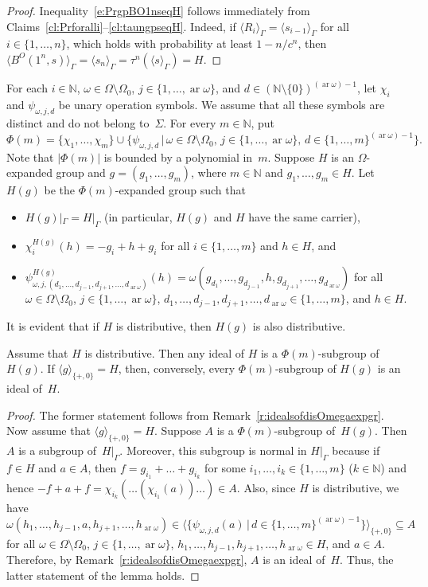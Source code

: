 \documentclass{jgcc}
\DeclareMathOperator{\ar}{ar}
\newcommand{\cs}{,\,}
\newcommand{\st}{\,|\,}
\newcommand{\Add}[1]{#1|_\Gamma}
\newcommand{\alg}[1]{\langle#1\rangle}
\newcommand{\gp}[1]{\langle#1\rangle_\Gamma}
\newcommand{\acl}[1]{\lvert#1\rvert}
\newcommand{\N}{\mathbb N}
\begin{document}
\begin{proof}
Inequality~\eqref{e:PrgpBO1nseqH} follows immediately from
Claims~\ref{cl:Prforalli}--\ref{cl:taungpseqH}. Indeed, if
$\gp{R_i}=\gp{s_{i-1}}$ for all $i\in\{1,\dots,n\}$, which
holds with probability at least $1-n/c^n$, then
$\gp{B^O(1^n,s)}=\gp{s_n}=\tau^n(\gp s)=H$.
\end{proof}

For each $i\in\N$, $\omega\in\Omega\setminus\Omega_0$,
$j\in\{1,\dots,\ar\omega\}$, and
$d\in(\N\setminus\{0\})^{(\ar\omega)-1}$, let $\chi_i$ and
$\psi_{\omega,j,d}$ be unary operation symbols. We assume
that all these symbols are distinct and do not belong
to~$\Sigma$. For every $m\in\N$, put
\[
\Phi(m)=\{\chi_1,\dots,\chi_m\}\cup\{\psi_{\omega,j,d}\st
\omega\in\Omega\setminus\Omega_0\cs
j\in\{1,\dots,\ar\omega\}\cs
d\in\{1,\dots,m\}^{(\ar\omega)-1}\}.
\]
Note that $\acl{\Phi(m)}$ is bounded by a polynomial in~$m$.
Suppose $H$ is an $\Omega$-expanded group and
$g=(g_1,\dots,g_m)$, where $m\in\N$ and $g_1,\dots,g_m\in
H$. Let $H(g)$ be the $\Phi(m)$-expanded group such that
\begin{itemize}
\item $\Add{H(g)}=\Add H$ (in particular, $H(g)$ and $H$
have the same carrier),

\item $\chi_i^{H(g)}(h)=-g_i+h+g_i$ for all
$i\in\{1,\dots,m\}$ and $h\in H$, and

\item $\psi_{\omega,j,(d_1,\dots,d_{j-1},d_{j+1},\dots,
d_{\ar\omega})}^{H(g)}(h)=\omega(g_{d_1},\dots,g_{d_{j-1}},
h,g_{d_{j+1}},\dots,g_{d_{\ar\omega}})$ for all
$\omega\in\Omega\setminus\Omega_0$,
$j\in\{1,\dots,\ar\omega\}$,
$d_1,\dots,d_{j-1},d_{j+1},\dots,d_{\ar\omega}\in\{1,\dots,m\}$,
and $h\in H$.
\end{itemize}
It is evident that if $H$ is distributive, then $H(g)$ is
also distributive.

\begin{lem}
\label{l:idofHandPhimsubgrofHg}
Assume that $H$ is distributive. Then any ideal of $H$ is a
$\Phi(m)$-subgroup of $H(g)$. If $\alg g_{\{+,0\}}=H$, then,
conversely, every $\Phi(m)$-subgroup of $H(g)$ is an ideal
of~$H$.
\end{lem}
\begin{proof}
The former statement follows from
Remark~\ref{r:idealsofdisOmegaexpgr}. Now assume that $\alg
g_{\{+,0\}}=H$. Suppose $A$ is a $\Phi(m)$-subgroup
of~$H(g)$. Then $A$ is a subgroup of~$\Add H$. Moreover,
this subgroup is normal in $\Add H$ because if $f\in H$ and
$a\in A$, then $f=g_{i_1}+\dots+g_{i_k}$ for some
$i_1,\dots,i_k\in\{1,\dots,m\}$ ($k\in\N$) and hence
$-f+a+f=\chi_{i_k}(\dots(\chi_{i_1}(a))\dots)\in A$. Also,
since $H$ is distributive, we have
\[
\omega(h_1,\dots,h_{j-1},a,h_{j+1},\dots,h_{\ar\omega})
\in\alg{\{\psi_{\omega,j,d}(a)\st
d\in\{1,\dots,m\}^{(\ar\omega)-1}\}}_{\{+,0\}}\subseteq A
\]
for all $\omega\in\Omega\setminus\Omega_0$,
$j\in\{1,\dots,\ar\omega\}$,
$h_1,\dots,h_{j-1},h_{j+1},\dots,h_{\ar\omega}\in H$, and
$a\in A$. Therefore, by
Remark~\ref{r:idealsofdisOmegaexpgr}, $A$ is an ideal
of~$H$. Thus, the latter statement of the lemma holds.
\end{proof}
\end{document}
